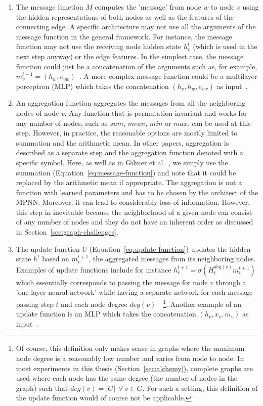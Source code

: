 \begin{enumerate}
	\item The message function $M$ computes the 'message' from node $w$ to node $v$ using the hidden representations of both nodes as well as the features of the connecting edge. A specific architecture may not use all the arguments of the message function in the general framework. For instance, the message function may not use the receiving node hidden state $h_v^t$ (which is used in the next step anyway) or the edge features. In the simplest case, the message function could just be a concatenation of the arguments such as, for example, $m_v^{t+1} = (h_w, e_{vw})$~\cite{Duvenaud2015}. A more complex message function could be a multilayer perceptron (MLP) which takes the concatenation $(h_v, h_w, e_{vw})$ as input~\cite{Battaglia2016}.
	
	\item An aggregation function aggregates the messages from all the neighboring nodes of node $v$. Any function that is permutation invariant and works for any number of nodes, such as $sum$, $mean$, $min$ or $max$, can be used at this step. However, in practice, the reasonable options are mostly limited to summation and the arithmetic mean.	
	In other papers, aggregation is described as a separate step and the aggregation function denoted with a specific symbol. Here, as well as in Gilmer et al.~\cite{Gilmer2017}, we simply use the summation (Equation~\ref{eq:message-function}) and note that it could be replaced by the arithmetic mean if appropriate.
	The aggregation is not a function with learned parameters and has to be chosen by the architect of the MPNN. Moreover, it can lead to considerably loss of information. However, this step in inevitable because the neighborhood of a given node can consist of any number of nodes and they do not have an inherent order as discussed in Section~\ref{sec:graph-challenges}.
	
	\item The update function $U$ (Equation~\ref{eq:update-function}) updates the hidden state $h^t$ based on  $m_v^{t+1}$, the aggregated messages from its neighboring nodes. Examples of update functions include for instance $h_v^{t+1} = \sigma(H_t^{deg(v)} m_v^{t+1})$ which essentially corresponds to passing the message for node $v$ through a 'one-layer neural network' while having a separate network for each message passing step $t$ and each node degree $deg(v)$~\cite{Duvenaud2015}~\footnote{
		Of course, this definition only makes sense in graphs where the maximum node degree is a reasonably low number  and varies from node to node. In most experiments in this thesis (Section~\ref{sec:alchemy}), complete graphs are used where each node has the same degree (the number of nodes in the graph) such that $deg(v) =|G|~~ \forall~ v \in G$. For such a setting, this definition of the update function would of course not be applicable.
	}. Another example of an update function is an MLP which takes the concatenation $(h_v, x_v, m_v)$ as input~\cite{Battaglia2016}.
\end{enumerate}

